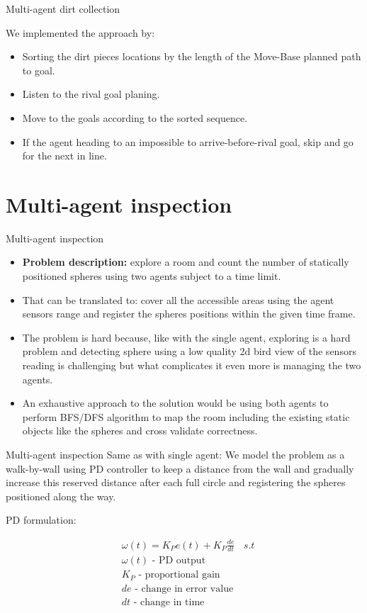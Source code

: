\documentclass[10pt]{beamer}
\begin{document}
\begin{frame}{Multi-agent dirt collection}

We implemented the approach by:
\begin{itemize}
\item Sorting the dirt pieces locations by the length of the Move-Base planned path to goal.
\item Listen to the rival goal planing.
\item Move to the goals according to the sorted sequence.
\item If the agent heading to an impossible to arrive-before-rival goal, skip and go for the next in line.

\end{itemize}
\end{frame}

\section{Multi-agent inspection}
\begin{frame}{Multi-agent inspection}
\begin{itemize}
    \item {\bf Problem description:} explore a room and count the number of statically positioned spheres using two agents subject to a time limit. 
    \item That can be translated to: cover all the accessible areas using the agent sensors range and register the spheres positions within the given time frame.
    \item The problem is hard because, like with the single agent,  exploring is a hard problem and detecting sphere using a low quality 2d bird view of the sensors reading is challenging but what complicates it even more is managing the two agents.
    \item An exhaustive approach to the solution would be using both agents to perform BFS/DFS algorithm to map the room including the existing static objects like the spheres and cross validate correctness.
\end{itemize}
\end{frame}

\begin{frame}{Multi-agent inspection}
    Same as with single agent: We model the problem as a walk-by-wall using PD controller to keep a distance from the wall and gradually increase this reserved distance after each full circle and registering the spheres positioned along the way.
    
    PD formulation:

\begin{align*} 
&\omega(t)=K_{P} e(t)+K_{P} \frac{d e}{d t}\ \ \ \ s.t\\
&\omega(t)\text{ - PD output }\\
&K_{P}\text{ - proportional gain }\\
&de\text{ - change in error value }\\
&dt\text{ - change in time } 
\end{align*}    

\end{frame}
\end{document}
